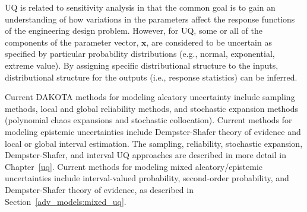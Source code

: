 UQ is related to sensitivity analysis in that the common goal is to
gain an understanding of how variations in the parameters affect the
response functions of the engineering design problem. However, for UQ,
some or all of the components of the parameter vector, $\mathbf{x}$,
are considered to be uncertain as specified by particular probability
distributions (e.g., normal, exponential, extreme value).  By
assigning specific distributional structure to the inputs,
distributional structure for the outputs (i.e., response statistics)
can be inferred.

Current DAKOTA methods for modeling aleatory uncertainty include
sampling methods, local and global reliability methods, and stochastic
expansion methods (polynomial chaos expansions and stochastic
collocation).  Current methods for modeling epistemic uncertainties
include Dempster-Shafer theory of evidence and local or global
interval estimation.  The sampling, reliability, stochastic expansion,
Dempster-Shafer, and interval UQ approaches are described in more
detail in Chapter~\ref{uq}.  Current methods for modeling mixed
aleatory/epistemic uncertainties include interval-valued probability,
second-order probability, and Dempster-Shafer theory of evidence, as
described in Section~\ref{adv_models:mixed_uq}.


